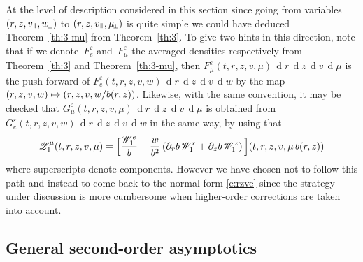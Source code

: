 \documentclass[JEP,XML,SOM,Unicode]{cedram}
\let\mathcal\mathscr
\newcommand\mto{\mathchoice{\longmapsto}{\mapsto}{\mapsto}{\mapsto}}
\newcommand{\sperp}{{\scriptscriptstyle\perp}}
\let\eps\varepsilon
\let\d\partial
\DeclareMathOperator\dD{d}\let\dd\dD
\theoremstyle{plain}
\theoremstyle{definition}
\newcommand\cW{{\mathcal W}}
\newcommand\cZ{{\mathcal Z}}
\newcommand\vpar{v_\mypar}
\newcommand\eperp{w_{\!\sperp}}
\let\e w
\newcommand\muperp{\mu_{\!\sperp}}
\newcommand{\mypar}{{\mkern3mu\vphantom{\perp}\vrule depth 0pt\mkern2mu\vrule depth 0pt\mkern3mu}}
\begin{document}
At the level of description considered in this section since going from variables $(r,z,\vpar,\eperp)$ to $(r,z,\vpar,\muperp)$ is quite simple we could have deduced Theorem~\ref{th:3-mu} from Theorem~\ref{th:3}. To give two hints in this direction, note that if we denote~$F^\eps_e$ and~$F^\eps_\mu$ the averaged densities respectively from Theorem~\ref{th:3} and Theorem~\ref{th:3-mu}, then $F^\eps_\mu(t,r,z,v,\mu)\,\dD\!r\,\dD\!z\,\dD\!v\,\dD\!\mu$ is the push-forward of $F^\eps_e(t,r,z,v,\e)\,\dD\!r\,\dD\!z\,\dD\!v\,\dD\!\e$ by the map $(r,z,v,\e)\mto (r,z,v,\e/b(r,z))$. Likewise, with the same convention, it may be checked that $G^\eps_\mu(t,r,z,v,\mu)\,\dD\!r\,\dD\!z\,\dD\!v\,\dD\!\mu$ is obtained from $G^\eps_e(t,r,z,v,\e)\,\dD\!r\,\dD\!z\,\dD\!v\,\dD\!\e$ in the same way, by using that
\[
\cZ_1^{\mu}(t,r,z,v,\mu)
=
\Bigl[\frac{\cW_1^e}{b}
-\frac{\e}{b^2}\left(\d_rb\,\cW_1^r
+\d_zb\,\cW_1^z\right)\Bigl](t,r,z,v,\mu\,b(r,z))
\]
where superscripts denote components. However we have chosen not to follow this path and instead to come back to the normal form \eqref{e:rzve} since the strategy under discussion is more cumbersome when higher-order corrections are taken into account.

\subsection{General second-order asymptotics}
\end{document}

